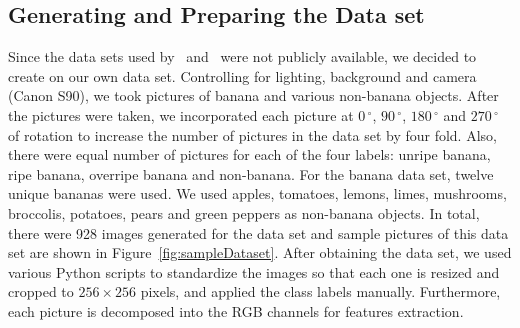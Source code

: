 \documentclass{article} %
\begin{document}
\subsection{Generating and Preparing the Data set}

Since the data sets used by~\citet{saad2009recognizing} and~\citet{paulraj2009color} were not publicly available, we decided to create on our own data set. Controlling for lighting, background and camera (Canon S90), we took pictures of banana and various non-banana objects. After the pictures were taken, we incorporated each picture at $0\,^{\circ}$, $90\,^{\circ}$, $180\,^{\circ}$ and  $270\,^{\circ}$ of rotation to increase the number of pictures in the data set by four fold. Also, there were equal number of pictures for each of the four labels: unripe banana, ripe banana, overripe banana and non-banana. For the banana data set, twelve unique bananas were used. We used apples, tomatoes, lemons, limes, mushrooms, broccolis, potatoes, pears and green peppers as non-banana objects. In total, there were 928 images generated for the data set and sample pictures of this data set are shown in Figure~\ref{fig:sampleDataset}. After obtaining the data set, we used various Python scripts to standardize the images so that each one is resized and cropped to $256\times 256$ pixels, and applied the class labels manually. Furthermore, each picture is decomposed into the RGB channels for features extraction. 
\end{document}

